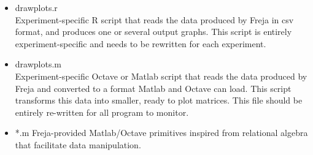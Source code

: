 \begin{itemize}
\item drawplots.r\\
Experiment-specific R script that reads the data produced by Freja in csv format, and produces one or several output graphs. This script is entirely experiment-specific and needs to be rewritten for each experiment.
\item drawplots.m\\
Experiment-specific Octave or Matlab script that reads the data produced by Freja and converted to a format Matlab and Octave can load. This script transforms this data into smaller, ready to plot matrices. This file should be entirely re-written for all program to monitor.
\item *.m
Freja-provided Matlab/Octave primitives inspired from relational algebra that facilitate data manipulation.
\end{itemize}


